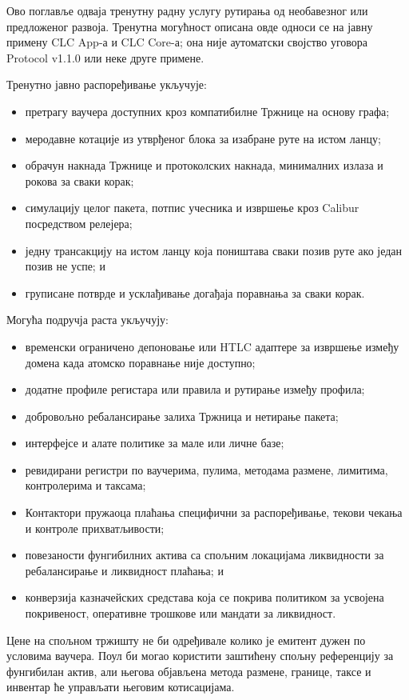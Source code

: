 \documentclass[11pt]{article}
\begin{document}
Ово поглавље одваја тренутну радну услугу рутирања од необавезног или предложеног развоја. Тренутна могућност описана овде односи се на јавну примену CLC App-а и CLC Core-а; она није аутоматски својство уговора Protocol v1.1.0 или неке друге примене.

Тренутно јавно распоређивање укључује:

\begin{itemize}[leftmargin=*]
\item претрагу ваучера доступних кроз компатибилне Тржнице на основу графа;
\item меродавне котације из утврђеног блока за изабране руте на истом ланцу;
\item обрачун накнада Тржнице и протоколских накнада, минималних излаза и рокова за сваки корак;
\item симулацију целог пакета, потпис учесника и извршење кроз Calibur посредством релејера;
\item једну трансакцију на истом ланцу која поништава сваки позив руте ако један позив не успе; и
\item груписане потврде и усклађивање догађаја поравнања за сваки корак.
\end{itemize}
Могућа подручја раста укључују:

\begin{itemize}[leftmargin=*]
\item временски ограничено депоновање или HTLC адаптере за извршење између домена када атомско поравнање није доступно;
\item додатне профиле регистара или правила и рутирање између профила;
\item добровољно ребалансирање залиха Тржница и нетирање пакета;
\item интерфејсе и алате политике за мале или личне базе;
\item ревидирани регистри по ваучерима, пулима, методама размене, лимитима, контролерима и таксама;
\item Контактори пружаоца плаћања специфични за распоређивање, текови чекања и контроле прихватљивости;
\item повезаности фунгибилних актива са спољним локацијама ликвидности за ребалансирање и ликвидност плаћања; и
\item конверзија казначейских средстава која се покрива политиком за усвојена покривеност, оперативне трошкове или мандати за ликвидност.
\end{itemize}
Цене на спољном тржишту не би одређивале колико је емитент дужен по условима ваучера. Поул би могао користити заштићену спољну референцију за фунгибилан актив, али његова објављена метода размене, границе, таксе и инвентар ће управљати његовим котисацијама.
\end{document}

